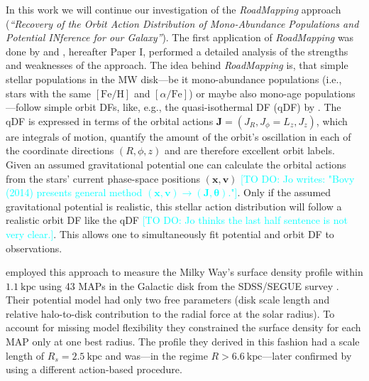 \documentclass[iop,revtex4,numberedappendix,appendixfloats]{emulateapj}
\newcommand{\vect}[1]{\boldsymbol{#1}}
\newcommand{\RM}{{\sl RoadMapping}}
\newcommand{\Jo}[1]{\textcolor{Cyan}{#1}}
\begin{document}
In this work we will continue our investigation of the \RM{} approach (\emph{``Recovery of the Orbit Action Distribution of Mono-Abundance Populations and Potential INference for our Galaxy''}). The first application of \RM{} was done by \citet{2013ApJ...779..115B} and \citet{2016arXiv160508601T}, hereafter Paper I, performed a detailed analysis of the strengths and weaknesses of the approach. The idea behind \RM{} is, that simple stellar populations in the MW disk---be it mono-abundance populations \citep{2012ApJ...751..131B,2012ApJ...753..148B,2012ApJ...755..115B,2016ApJ...823...30B} (i.e., stars with the same $[\mathrm{Fe}/\mathrm{H}]$ and $[\alpha/\mathrm{Fe}]$) or maybe also mono-age populations \citep{2013ApJ...773...43B,2014MNRAS.442.2474M,2016MNRAS.456.3655M,2014A&A...572A..92M,2016ApJ...823..114N}---follow simple orbit DFs, like, e.g., the quasi-isothermal DF (qDF) by \citet{2011MNRAS.413.1889B} \citep{2013MNRAS.434..652T}. The qDF is expressed in terms of the orbital actions $\vect{J}=(J_R,J_\phi=L_z,J_z)$, which are integrals of motion, quantify the amount of the orbit's oscillation in each of the coordinate directions $(R,\phi,z)$ and are therefore excellent orbit labels. Given an assumed gravitational potential one can calculate the orbital actions from the stars' current phase-space positions $(\vect{x},\vect{v})$ \citep{2012MNRAS.426.1324B,2016MNRAS.457.2107S} \Jo{[TO DO: Jo writes: "Bovy (2014) presents general method $(\vect{x},\vect{v})\longrightarrow(\vect{J},\vect{\theta})$."]}. Only if the assumed gravitational potential is realistic, this stellar action distribution will follow a realistic orbit DF like the qDF \Jo{[TO DO: Jo thinks the last half sentence is not very clear.]}. This allows one to simultaneously fit potential and orbit DF to observations.

\citet{2013ApJ...779..115B} employed this approach to measure the Milky Way's surface density profile within $1.1~\text{kpc}$ using 43 MAPs in the Galactic disk from the SDSS/SEGUE survey \citep{2009AJ....137.4377Y}. Their potential model had only two free parameters (disk scale length and relative halo-to-disk contribution to the radial force at the solar radius). To account for missing model flexibility they constrained the surface density for each MAP only at one best radius. The profile they derived in this fashion had a scale length of $R_s=2.5~\text{kpc}$ and was---in the regime $R>6.6~\text{kpc}$---later confirmed by \citet{2014MNRAS.445.3133P} using a different action-based procedure.
\end{document}
